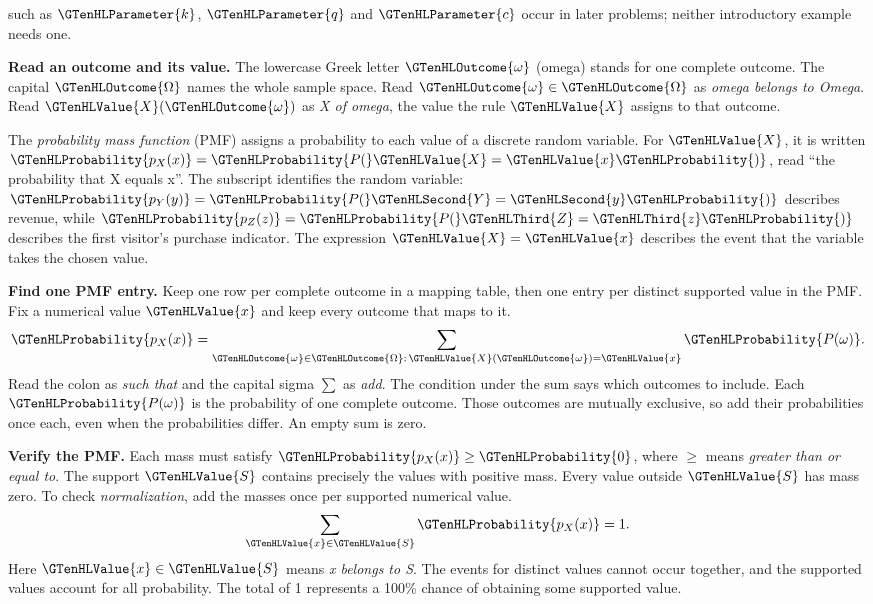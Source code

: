 \endgroup
\noindent{} such as $\GTenHLParameter{k}$, $\GTenHLParameter{q}$ and $\GTenHLParameter{c}$ occur in later problems; neither introductory example needs one.


\textbf{Read an outcome and its value.} The lowercase Greek letter $\GTenHLOutcome{\omega}$ (omega) stands for one complete outcome. The capital $\GTenHLOutcome{\Omega}$ names the whole sample space. Read $\GTenHLOutcome{\omega}\in\GTenHLOutcome{\Omega}$ as \emph{omega belongs to Omega}. Read $\GTenHLValue{X}(\GTenHLOutcome{\omega})$ as \emph{X of omega}, the value the rule $\GTenHLValue{X}$ assigns to that outcome.

The \emph{probability mass function} (PMF) assigns a probability to each value of a discrete random variable. For $\GTenHLValue{X}$, it is written $\GTenHLProbability{p_{X}(x)}=\GTenHLProbability{P(}\GTenHLValue{X}=\GTenHLValue{x}\GTenHLProbability{)}$, read ``the probability that X equals x''. The subscript identifies the random variable: $\GTenHLProbability{p_{Y}(y)}=\GTenHLProbability{P(}\GTenHLSecond{Y}=\GTenHLSecond{y}\GTenHLProbability{)}$ describes revenue, while $\GTenHLProbability{p_{Z}(z)}=\GTenHLProbability{P(}\GTenHLThird{Z}=\GTenHLThird{z}\GTenHLProbability{)}$ describes the first visitor's purchase indicator.
The expression $\GTenHLValue{X}=\GTenHLValue{x}$ describes the event that the variable takes the chosen value.

\textbf{Find one PMF entry.} Keep one row per complete outcome in a mapping table, then one entry per distinct supported value in the PMF. Fix a numerical value $\GTenHLValue{x}$ and keep every outcome that maps to it.
\[
\GTenHLProbability{p_{X}(x)}
=\sum_{\GTenHLOutcome{\omega}\in\GTenHLOutcome{\Omega}:\,\GTenHLValue{X}(\GTenHLOutcome{\omega})=\GTenHLValue{x}}\GTenHLProbability{P(\omega)}.
\]
Read the colon as \emph{such that} and the capital sigma $\sum$ as \emph{add}. The condition under the sum says which outcomes to include. Each $\GTenHLProbability{P(\omega)}$ is the probability of one complete outcome. Those outcomes are mutually exclusive, so add their probabilities once each, even when the probabilities differ. An empty sum is zero.

\textbf{Verify the PMF.} Each mass must satisfy $\GTenHLProbability{p_{X}(x)}\geq\GTenHLProbability{0}$, where $\geq$ means \emph{greater than or equal to}. The support $\GTenHLValue{S}$ contains precisely the values with positive mass. Every value outside $\GTenHLValue{S}$ has mass zero. To check \emph{normalization}, add the masses once per supported numerical value.
\[
\sum_{\GTenHLValue{x}\in\GTenHLValue{S}}\GTenHLProbability{p_{X}(x)}=1.
\]
Here $\GTenHLValue{x}\in\GTenHLValue{S}$ means \emph{x belongs to S}. The events for distinct values cannot occur together, and the supported values account for all probability. The total of 1 represents a 100\% chance of obtaining some supported value.

